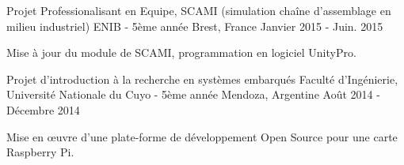 \begin{cventries}
\cventry
{Projet Professionalisant en Equipe, SCAMI (simulation chaîne d'assemblage en milieu industriel)} %
{ENIB - 5ème année} %
{Brest, France} %
{Janvier 2015 - Juin. 2015 } %
{
	\begin{cvitems} %
		\item {Mise à jour du module de SCAMI, programmation en logiciel UnityPro. }
	\end{cvitems}
}
  \cventry
    {Projet d'introduction à la recherche en systèmes embarqués} %
    {Faculté d'Ingénierie, Université Nationale du Cuyo - 5ème année} %
    {Mendoza, Argentine} %
    {Août 2014 - Décembre 2014 } %
    {
      \begin{cvitems} %
        \item {Mise en \oe{uvre} d'une plate-forme de développement Open Source pour une carte Raspberry Pi.}
      \end{cvitems}
    }



\end{cventries}
